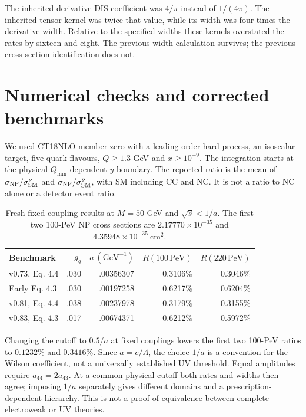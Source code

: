 \documentclass[11pt,a4paper]{article}
\begin{document}
The inherited derivative DIS coefficient was $4/\pi$ instead of $1/(4\pi)$.
The inherited tensor kernel was twice that value, while its width was four
times the derivative width. Relative to the specified widths these kernels
overstated the rates by sixteen and eight. The previous width calculation
survives; the previous cross-section identification does not.

\section{Numerical checks and corrected benchmarks}
We used CT18NLO member zero with a leading-order hard process, an isoscalar
target, five quark flavours, $Q\geq1.3$ GeV and $x\geq10^{-9}$.
The integration starts at the physical $Q_{\min}$-dependent $y$ boundary.
The reported ratio is the mean of $\sigma_{\rm NP}/\sigma^{\nu}_{\rm SM}$
and $\sigma_{\rm NP}/\sigma^{\bar\nu}_{\rm SM}$, with SM including CC and NC.
It is not a ratio to NC alone or a detector event ratio.

\begin{table}[ht]
\centering
\begin{tabular}{lrrrr}
\toprule
Benchmark & $g_q$ & $a\ (\mathrm{GeV}^{-1})$ & $R(100\,\mathrm{PeV})$ & $R(220\,\mathrm{PeV})$\\
\midrule
v0.73, Eq. 4.4 & .030 & .00356307 & 0.3106\% & 0.3046\%\\
Early Eq. 4.3 & .030 & .00197258 & 0.6217\% & 0.6204\%\\
v0.81, Eq. 4.4 & .038 & .00237978 & 0.3179\% & 0.3155\%\\
v0.83, Eq. 4.3 & .017 & .00674371 & 0.6212\% & 0.5972\%\\
\bottomrule
\end{tabular}
\caption{Fresh fixed-coupling results at $M=50$ GeV and $\sqrt{\hat s}<1/a$.
The first two 100-PeV NP cross sections are $2.17770\times10^{-35}$ and
$4.35948\times10^{-35}\ \mathrm{cm}^2$.}
\end{table}

Changing the cutoff to $0.5/a$ at fixed couplings lowers the first two
100-PeV ratios to $0.1232\%$ and $0.3416\%$. Since $a=c/\Lambda$, the choice
$1/a$ is a convention for the Wilson coefficient, not a universally established
UV threshold. Equal amplitudes require $a_{44}=2a_{43}$. At a common physical
cutoff both rates and widths then agree; imposing $1/a$ separately gives
different domains and a prescription-dependent hierarchy. This is not a proof
of equivalence between complete electroweak or UV theories.
\end{document}
